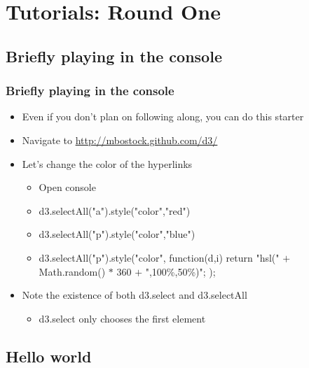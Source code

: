 \documentclass{beamer}
\begin{document}
\section{Tutorials: Round One}


\subsection{Briefly playing in the console}


\begin{frame}
    \frametitle{Briefly playing in the console}
    \begin{itemize}
    \item Even if you don't plan on following along, you can do this starter
    \item Navigate to \href{http://mbostock.github.com/d3/}{http://mbostock.github.com/d3/}
    \item Let's change the color of the hyperlinks
        \begin{itemize}
        \item Open console
        \item d3.selectAll("a").style("color","red")
        \item d3.selectAll("p").style("color","blue")
        \item d3.selectAll("p").style("color", function(d,i) {return "hsl(" $+$ Math.random() $*$ 360 $+$ ",100\%,50\%)"; });
        \end{itemize}
    \item Note the existence of both d3.select and d3.selectAll
        \begin{itemize}
        \item d3.select only chooses the first element
        \end{itemize}
    \end{itemize}
\end{frame}


\subsection{Hello world}
\end{document}
